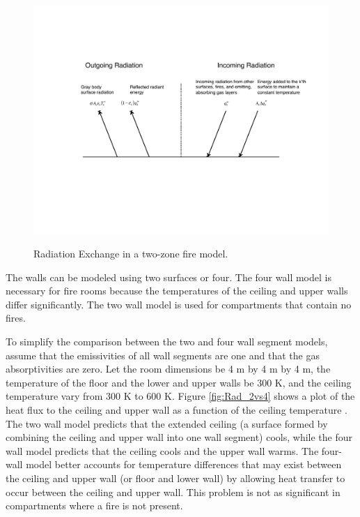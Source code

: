\begin{figure}
\begin{center}
\includegraphics[width=5.0in]{FIGURES/Theory/Radiation_Exchange}\\
\end{center}
\caption{Radiation Exchange in a two-zone fire model.}
 \label{fig:Rad_Exchange}
\end{figure}

The walls can be modeled using two surfaces or four.  The four wall model is necessary for fire rooms because the temperatures of the ceiling and upper walls differ significantly.  The two wall model is used for compartments that contain no fires.

To simplify the comparison between the two and four wall segment models, assume that the emissivities of all wall segments are one and that the gas absorptivities are zero.  Let the room dimensions be 4 m by 4 m by 4 m, the temperature of the floor and the lower and upper walls be 300 K, and the ceiling temperature vary from 300 K to 600 K. Figure \ref{fig:Rad_2vs4} shows a plot of the heat flux to the ceiling and upper wall as a function of the ceiling temperature \cite{Forney_radiation, Jones:1993}. The two wall model predicts that the extended ceiling (a surface formed by combining the ceiling and upper wall into one wall segment) cools, while the four wall model predicts that the ceiling cools and the upper wall warms.  The four-wall model better accounts for temperature differences that may exist between the ceiling and upper wall (or floor and lower wall) by allowing heat transfer to occur between the ceiling and upper wall. This problem is not as significant in compartments where a fire is not present.

